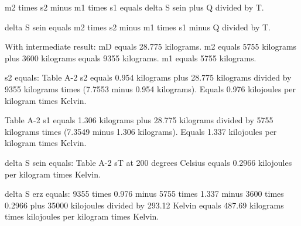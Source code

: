 m2 times s2 minus m1 times s1 equals delta S sein plus Q divided by T.  

delta S sein equals m2 times s2 minus m1 times s1 minus Q divided by T.  

With intermediate result:  
mD equals 28.775 kilograms.  
m2 equals 5755 kilograms plus 3600 kilograms equals 9355 kilograms.  
m1 equals 5755 kilograms.  

s2 equals:  
Table A-2  
s2 equals 0.954 kilograms plus 28.775 kilograms divided by 9355 kilograms times (7.7553 minus 0.954 kilograms).  
Equals 0.976 kilojoules per kilogram times Kelvin.  

Table A-2  
s1 equals 1.306 kilograms plus 28.775 kilograms divided by 5755 kilograms times (7.3549 minus 1.306 kilograms).  
Equals 1.337 kilojoules per kilogram times Kelvin.  

delta S sein equals:  
Table A-2  
sT at 200 degrees Celsius equals 0.2966 kilojoules per kilogram times Kelvin.  

delta S erz equals:  
9355 times 0.976 minus 5755 times 1.337 minus 3600 times 0.2966 plus 35000 kilojoules divided by 293.12 Kelvin equals 487.69 kilograms times kilojoules per kilogram times Kelvin.
